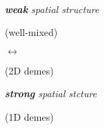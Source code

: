 \begin{figure}[h]
  \captionsetup[subfigure]{justification=raggedright}
  \begin{minipage}{\textwidth}

    \begin{minipage}{0.1\textwidth}~\end{minipage}%
    \begin{minipage}{0.25\textwidth}
      \centering
      \itshape
      {\large
      \textbf{weak} spatial structure
      }

      (well-mixed)
    \end{minipage}%
    \begin{minipage}{0.25\textwidth}
      \centering
      \itshape
      {\huge
      $\longleftrightarrow$
      }

      (2D demes)
    \end{minipage}%
    \begin{minipage}{0.25\textwidth}
      \centering
      \itshape
      {\large
      \textbf{strong} spatial stcture
      }

      (1D demes)
    \end{minipage}

    ~\vspace{-0.7ex}


\end{minipage}
\end{figure}
